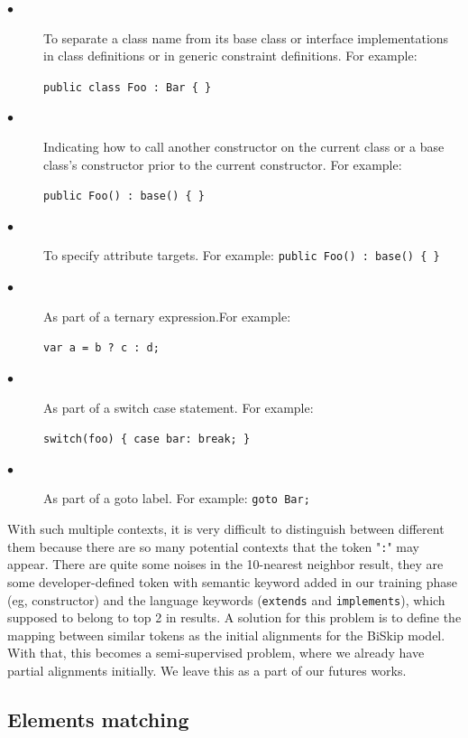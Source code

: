 \begin{description}
	\item [$\bullet$] To separate a class name from its base class or interface implementations in class definitions or in generic constraint definitions. For example: 
	
	\texttt{public class Foo : Bar \{ \}}
	\item [$\bullet$] Indicating how to call another constructor on the current class or a base class's constructor prior to the current constructor. For example: 
	
	\texttt{public Foo() : base() \{ \}}
	\item [$\bullet$] To specify attribute targets. For example: \texttt{public Foo() : base() \{ \}}
	\item [$\bullet$] As part of a ternary expression.For example:
	
	\texttt{var a = b ? c : d;}
	\item [$\bullet$] As part of a switch case statement. For example:
	
	\texttt{switch(foo) \{ case bar: break; \}}
	\item [$\bullet$] As part of a goto label. For example:
	\texttt{goto Bar;}
	
\end{description}

With such multiple contexts, it is very difficult to distinguish between different them because there are so many potential contexts that the token "\texttt{:}" may appear. There are quite some noises in the 10-nearest neighbor result, they are some developer-defined token with semantic keyword added in our training phase (eg, constructor) and the language keywords (\texttt{extends} and \texttt{implements}), which supposed to belong to top 2 in results. A solution for this problem is to define the mapping between similar tokens as the initial alignments for the BiSkip model. With that, this becomes a semi-supervised problem, where we already have partial alignments initially. We leave this as a part of our futures works.

\subsection{Elements matching}

